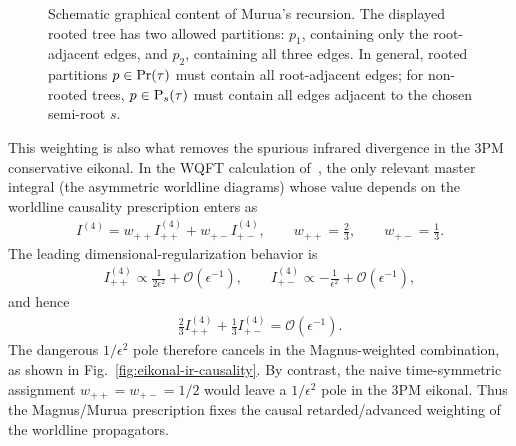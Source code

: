 {\begin{figure}[htb!]
\begin{tikzpicture}
\end{tikzpicture}
\caption{Schematic graphical content of Murua's recursion. The displayed rooted tree has two allowed partitions: \(p_1\), containing only the root-adjacent edges, and \(p_2\), containing all three edges. In general, rooted partitions \(p\in{\rm Pr}(\tau)\) must contain all root-adjacent edges; for non-rooted trees, \(p\in{\rm P}_{s}(\tau)\) must contain all edges adjacent to the chosen semi-root \(s\).}
\label{fig:eikonal-murua-trees}
\end{figure}
This weighting is also what removes the spurious infrared divergence in the 3PM conservative eikonal. In the WQFT calculation of~\cite{Kim:2024svw}, the only relevant master integral (the asymmetric worldline diagrams) whose value depends on the worldline causality prescription enters as
\begin{align}
    I^{(4)}
    =
    w_{++}I^{(4)}_{++}
    +
    w_{+-}I^{(4)}_{+-},
    \qquad
    w_{++}=\frac{2}{3},
    \qquad
    w_{+-}=\frac{1}{3}.
\end{align}
The leading dimensional-regularization behavior is
\begin{align}
    I^{(4)}_{++}
    \propto
    \frac{1}{2\epsilon^2}
    +\mathcal O(\epsilon^{-1}),
    \qquad
    I^{(4)}_{+-}
    \propto
    -\frac{1}{\epsilon^2}
    +\mathcal O(\epsilon^{-1}),
\end{align}
and hence
\begin{align}
    \frac{2}{3}I^{(4)}_{++}
    +
    \frac{1}{3}I^{(4)}_{+-}
    =
    \mathcal O(\epsilon^{-1}).
\end{align}
The dangerous \(1/\epsilon^2\) pole therefore cancels in the Magnus-weighted combination, as shown in Fig.~\eqref{fig:eikonal-ir-causality}. By contrast, the naive time-symmetric assignment \(w_{++}=w_{+-}=1/2\) would leave a \(1/\epsilon^2\) pole in the 3PM eikonal. Thus the Magnus/Murua prescription fixes the causal retarded/advanced weighting of the worldline propagators.

\begin{figure}[htb!]
\centering
\color{black}
\end{figure}}
